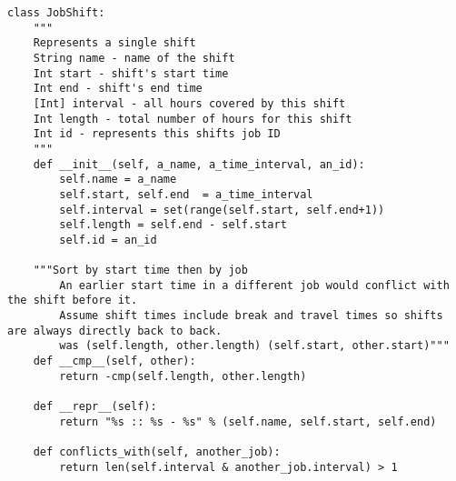 \documentclass[11pt]{article}
\theoremstyle{definition}
\begin{document}
\begin{lstlisting}
class JobShift:
    """
    Represents a single shift
    String name - name of the shift
    Int start - shift's start time
    Int end - shift's end time
    [Int] interval - all hours covered by this shift
    Int length - total number of hours for this shift
    Int id - represents this shifts job ID
    """
    def __init__(self, a_name, a_time_interval, an_id):
        self.name = a_name
        self.start, self.end  = a_time_interval
        self.interval = set(range(self.start, self.end+1))
        self.length = self.end - self.start
        self.id = an_id

    """Sort by start time then by job
        An earlier start time in a different job would conflict with the shift before it.
        Assume shift times include break and travel times so shifts are always directly back to back.
        was (self.length, other.length) (self.start, other.start)"""
    def __cmp__(self, other):
        return -cmp(self.length, other.length)

    def __repr__(self):
        return "%s :: %s - %s" % (self.name, self.start, self.end)

    def conflicts_with(self, another_job):
        return len(self.interval & another_job.interval) > 1
\end{lstlisting}
\end{document}
